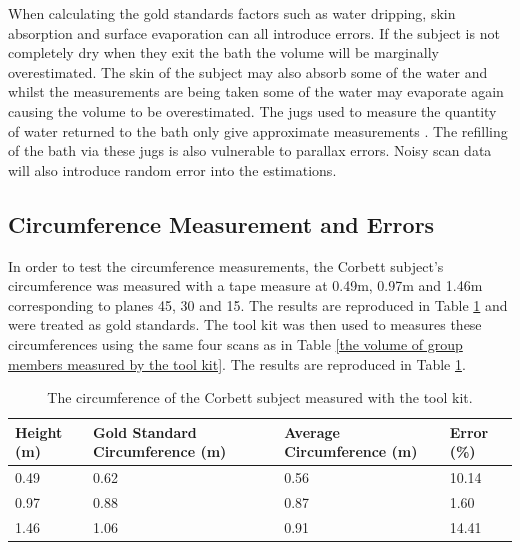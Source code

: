 When calculating the gold standards factors such as water dripping, skin absorption and surface evaporation can all introduce errors. If the subject is not completely dry when they exit the bath the volume will be marginally overestimated. The skin of the subject may also absorb some of the water and whilst the measurements are being taken some of the water may evaporate again causing the volume to be overestimated. The jugs used to measure the quantity of water returned to the bath only give approximate measurements \cite{ikea,pyrex}. The refilling of the bath via these jugs is also vulnerable to parallax errors. Noisy scan data will also introduce random error into the estimations.\\

\subsection{Circumference Measurement and Errors}
\label{errors in circumference measurement}
In order to test the circumference measurements, the Corbett subject's circumference was measured with a tape measure at 0.49m, 0.97m and 1.46m corresponding to planes 45, 30 and 15. The results are reproduced in Table \ref{the circumference of the Corbett subject measured with the tool kit} and were treated as gold standards. The tool kit was then used to measures these circumferences using the same four scans as in Table \ref{the volume of group members measured by the tool kit}. The results are reproduced in Table \ref{the circumference of the Corbett subject measured with the tool kit}.\\

\begin{table}[!htb]
\begin{center}
  \begin{tabular}{| l | p{3cm} | p{3cm} | p{2cm} |}
    \hline
    Height (m) & Gold Standard Circumference (m) & Average Circumference (m) & Error (\%)\\ \hline
    0.49 & 0.62 & 0.56 & 10.14\\ \hline
    0.97 & 0.88 & 0.87 & 1.60\\ \hline
    1.46 & 1.06 & 0.91 & 14.41\\ \hline
  \end{tabular}
\end{center}
\caption{The circumference of the Corbett subject measured with the tool kit.}
\label{the circumference of the Corbett subject measured with the tool kit}
\end{table}

